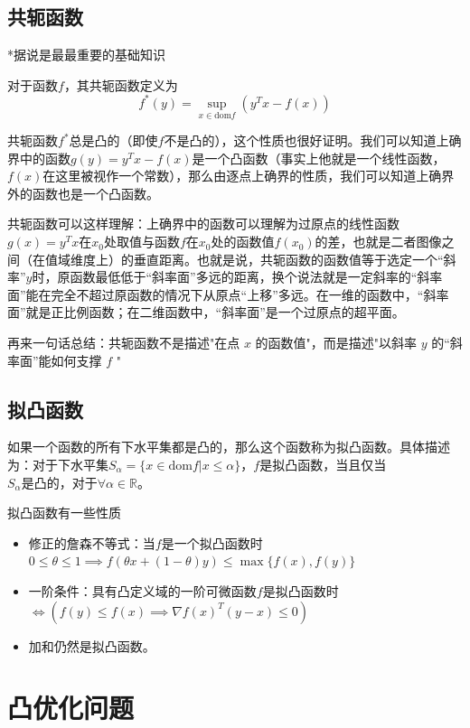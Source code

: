 \documentclass[12pt,a4paper]{book}
\begin{document}
\section{共轭函数}

*据说是最最重要的基础知识

对于函数$f$，其共轭函数定义为
\begin{equation}
f^*(y)=\sup_{x\in\text{dom} f}(y^Tx-f(x))
\end{equation}

共轭函数$f^*$总是凸的（即使$f$不是凸的），这个性质也很好证明。我们可以知道上确界中的函数$g(y)=y^Tx-f(x)$是一个凸函数（事实上他就是一个线性函数，$f(x)$在这里被视作一个常数），那么由逐点上确界的性质，我们可以知道上确界外的函数也是一个凸函数。

共轭函数可以这样理解：上确界中的函数可以理解为过原点的线性函数$g(x) = y^Tx$在$x_0$处取值与函数$f$在$x_0$处的函数值$f(x_0)$的差，也就是二者图像之间（在值域维度上）的垂直距离。也就是说，共轭函数的函数值等于选定一个“斜率”$y$时，原函数最低低于“斜率面”多远的距离，换个说法就是一定斜率的“斜率面”能在完全不超过原函数的情况下从原点“上移”多远。在一维的函数中，“斜率面”就是正比例函数；在二维函数中，“斜率面”是一个过原点的超平面。

再来一句话总结：共轭函数不是描述"在点 $x$ 的函数值"，而是描述"以斜率 $y$ 的“斜率面”能如何支撑 $f$ "



\section{拟凸函数}

如果一个函数的所有下水平集都是凸的，那么这个函数称为拟凸函数。具体描述为：对于下水平集$S_\alpha=\{x\in\text{dom}f|x\leq\alpha\}$，$f$是拟凸函数，当且仅当$S_\alpha\text{是凸的，对于}\forall \alpha\in\mathbb{R}$。

拟凸函数有一些性质
\begin{itemize}
    \item 修正的詹森不等式：当$f$是一个拟凸函数时$0\leq\theta\leq 1 \implies f(\theta x+(1-\theta)y)\leq\max\{f(x),f(y)\}$
    \item 一阶条件：具有凸定义域的一阶可微函数$f$是拟凸函数时$\Leftrightarrow (f(y)\leq f(x) \implies \nabla f(x)^T(y-x)\leq 0)$
    \item 加和仍然是拟凸函数。
\end{itemize}

\chapter{凸优化问题}
\end{document}
